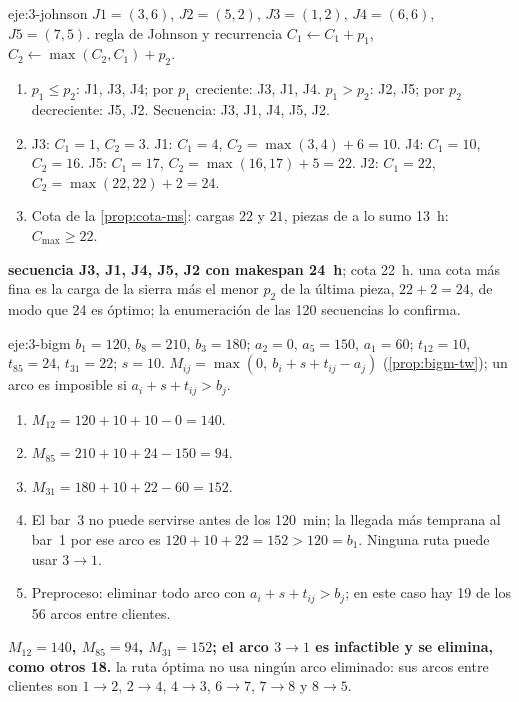 \begin{solucion}{eje:3-johnson}
\datos $J1=(3,6)$, $J2=(5,2)$, $J3=(1,2)$, $J4=(6,6)$, $J5=(7,5)$.
\planteamiento regla de Johnson y recurrencia $C_1\leftarrow C_1+p_1$, $C_2\leftarrow\max(C_2,C_1)+p_2$.
\pasos
\begin{enumerate}[label=\arabic*.]
  \item $p_1\le p_2$: J1, J3, J4; por $p_1$ creciente: J3, J1, J4. $p_1>p_2$: J2, J5; por $p_2$ decreciente: J5, J2. Secuencia: J3, J1, J4, J5, J2.
  \item J3: $C_1=1$, $C_2=3$. J1: $C_1=4$, $C_2=\max(3,4)+6=10$. J4: $C_1=10$, $C_2=16$. J5: $C_1=17$, $C_2=\max(16,17)+5=22$. J2: $C_1=22$, $C_2=\max(22,22)+2=24$.
  \item Cota de la \cref{prop:cota-ms}: cargas $22$ y $21$, piezas de a lo sumo 13~h: $C_{\max}\ge 22$.
\end{enumerate}
\resultado \textbf{secuencia J3, J1, J4, J5, J2 con makespan 24~h}; cota 22~h.
\comprobacion una cota más fina es la carga de la sierra más el menor $p_2$ de la última pieza, $22+2=24$, de modo que 24 es óptimo; la enumeración de las 120 secuencias lo confirma.
\end{solucion}

\begin{solucion}{eje:3-bigm}
\datos $b_1=120$, $b_8=210$, $b_3=180$; $a_2=0$, $a_5=150$, $a_1=60$; $t_{12}=10$, $t_{85}=24$, $t_{31}=22$; $s=10$.
\planteamiento $M_{ij}=\max(0,\ b_i+s+t_{ij}-a_j)$ (\cref{prop:bigm-tw}); un arco es imposible si $a_i+s+t_{ij}>b_j$.
\pasos
\begin{enumerate}[label=\arabic*.]
  \item $M_{12}=120+10+10-0=140$.
  \item $M_{85}=210+10+24-150=94$.
  \item $M_{31}=180+10+22-60=152$.
  \item El bar~3 no puede servirse antes de los 120~min; la llegada más temprana al bar~1 por ese arco es $120+10+22=152>120=b_1$. Ninguna ruta puede usar $3\to 1$.
  \item Preproceso: eliminar todo arco con $a_i+s+t_{ij}>b_j$; en este caso hay 19 de los 56 arcos entre clientes.
\end{enumerate}
\resultado \textbf{$M_{12}=140$, $M_{85}=94$, $M_{31}=152$; el arco $3\to 1$ es infactible y se elimina, como otros 18.}
\comprobacion la ruta óptima no usa ningún arco eliminado: sus arcos entre clientes son $1\to 2$, $2\to 4$, $4\to 3$, $6\to 7$, $7\to 8$ y $8\to 5$.
\end{solucion}

